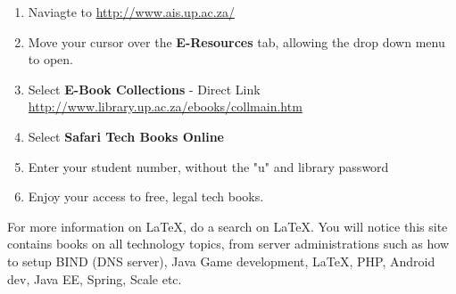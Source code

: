 \documentclass[a4paper,10pt]{article}
\begin{document}
\begin{enumerate}
\item Naviagte to \url{http://www.ais.up.ac.za/}
\item Move your cursor over the \textbf{E-Resources} tab, allowing the drop down menu to open.
\item Select \textbf{E-Book Collections} - Direct Link \url{http://www.library.up.ac.za/ebooks/collmain.htm}
\item Select \textbf{Safari Tech Books Online}
\item Enter your student number, without the "u" and library password
\item Enjoy your access to free, legal tech books.
\end{enumerate}

For more information on \LaTeX{}, do a search on \LaTeX{}. You will notice this site contains books on all technology topics, from server administrations such as how to setup BIND (DNS server), Java Game development, LaTeX, PHP, Android dev, Java EE, Spring, Scale etc.
\end{document}
